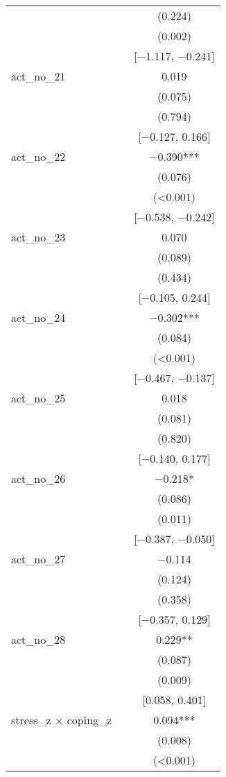 \documentclass[
]{article}
\begin{document}
\begin{table}[H]
\begin{tabular}[t]{lcc}
 &  & (\num{0.224})\\
 &  & (\num{0.002})\\
 &  & {}[\num{-1.117}, \num{-0.241}]\\
act\_no\_21 &  & \num{0.019}\\
 &  & (\num{0.075})\\
 &  & (\num{0.794})\\
 &  & {}[\num{-0.127}, \num{0.166}]\\
act\_no\_22 &  & \num{-0.390}***\\
 &  & (\num{0.076})\\
 &  & \vphantom{2} (\num{<0.001})\\
 &  & {}[\num{-0.538}, \num{-0.242}]\\
act\_no\_23 &  & \num{0.070}\\
 &  & (\num{0.089})\\
 &  & (\num{0.434})\\
 &  & {}[\num{-0.105}, \num{0.244}]\\
act\_no\_24 &  & \num{-0.302}***\\
 &  & (\num{0.084})\\
 &  & \vphantom{1} (\num{<0.001})\\
 &  & {}[\num{-0.467}, \num{-0.137}]\\
act\_no\_25 &  & \num{0.018}\\
 &  & (\num{0.081})\\
 &  & (\num{0.820})\\
 &  & {}[\num{-0.140}, \num{0.177}]\\
act\_no\_26 &  & \num{-0.218}*\\
 &  & (\num{0.086})\\
 &  & (\num{0.011})\\
 &  & {}[\num{-0.387}, \num{-0.050}]\\
act\_no\_27 &  & \num{-0.114}\\
 &  & (\num{0.124})\\
 &  & (\num{0.358})\\
 &  & {}[\num{-0.357}, \num{0.129}]\\
act\_no\_28 &  & \num{0.229}**\\
 &  & (\num{0.087})\\
 &  & (\num{0.009})\\
 &  & {}[\num{0.058}, \num{0.401}]\\
stress\_z × coping\_z &  & \num{0.094}***\\
 &  & (\num{0.008})\\
 &  & (\num{<0.001})\\

\end{tabular}
\end{table}
\end{document}
